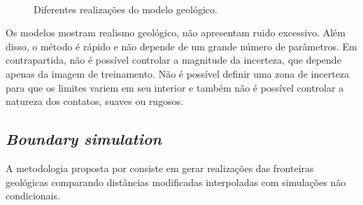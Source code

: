 \begin{figure}[H]
\caption{Diferentes realizações do modelo geológico.} 
\label{snesim_real}
\begin{center}
\\
\end{center}
\begin{center}
\end{center}
\end{figure}

Os modelos mostram realismo geológico, não apresentam ruido excessivo. Além disso, o método é rápido e não depende de um grande número de parâmetros. Em contrapartida, não é possível controlar a magnitude da incerteza, que depende apenas da imagem de treinamento. Não é possível definir uma zona de incerteza para que os limites variem em seu interior e também não é possível controlar a natureza dos contatos, suaves ou rugosos. 

\subsection{\textit{Boundary simulation}}\label{boundsim}

A metodologia proposta por  consiste em gerar realizações das fronteiras geológicas comparando distâncias modificadas interpoladas com simulações não condicionais. 

